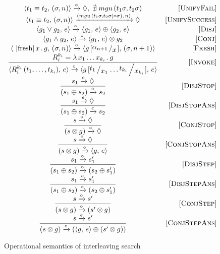 \begin{figure*}[h]
  \renewcommand{\arraystretch}{1.6}
  \[
  \begin{array}{cr}
    \taskst{t_1 \equiv t_2}{(\sigma, n)} \xrightarrow{\circ} \Diamond , \, \, \nexists\; mgu\,(t_1 \sigma, t_2 \sigma) &\ruleno{UnifyFail} \\
    \taskst{t_1 \equiv t_2}{(\sigma, n)} \xrightarrow{(mgu\,(t_1 \sigma, t_2 \sigma) \circ \sigma),\, n)} \Diamond & \ruleno{UnifySuccess} \\
    \taskst{g_1 \lor g_2}{e} \xrightarrow{\circ} \taskst{g_1}{e} \oplus \taskst{g_2}{e} & \ruleno{Disj} \\
    \taskst{g_1 \land g_2}{e} \xrightarrow{\circ} \taskst{g_1}{e} \otimes g_2 & \ruleno{Conj} \\
    \taskst{\mbox{\lstinline|fresh|}\, x\, .\, g}{(\sigma, n)} \xrightarrow{\circ} \taskst{g\,[\bigslant{\alpha_{n + 1}}{x}]}{( \sigma, n + 1)} & \ruleno{Fresh} \\
    \dfrac{R_i^{k_i}=\lambda\,x_1\dots x_{k_i}\,.\,g}{\taskst{R_i^{k_i}\,(t_1,\dots,t_{k_i})}{e} \xrightarrow{\circ} \taskst{g\,[\bigslant{t_1}{x_1}\dots\bigslant{t_{k_i}}{x_{k_i}}]}{e}} & \ruleno{Invoke}\\
    \dfrac{s_1 \xrightarrow{\circ} \Diamond}{(s_1 \oplus s_2) \xrightarrow{\circ} s_2} & \ruleno{DisjStop}\\
    \dfrac{s_1 \xrightarrow{e} \Diamond}{(s_1 \oplus s_2) \xrightarrow{e} s_2} & \ruleno{DisjStopAns}\\
    \dfrac{s \xrightarrow{\circ} \Diamond}{(s \otimes g) \xrightarrow{\circ} \Diamond} &\ruleno{ConjStop}\\
    \dfrac{s \xrightarrow{e} \Diamond}{(s \otimes g) \xrightarrow{\circ} \taskst{g}{e}}  & \ruleno{ConjStopAns}\\
    \dfrac{s_1 \xrightarrow{\circ} s'_1}{(s_1 \oplus s_2) \xrightarrow{\circ} (s_2 \oplus s'_1)} &\ruleno{DisjStep}\\
    \dfrac{s_1 \xrightarrow{e} s'_1}{(s_1 \oplus s_2) \xrightarrow{e} (s_2 \oplus s'_1)} &\ruleno{DisjStepAns}\\
    \dfrac{s \xrightarrow{\circ} s'}{(s \otimes g) \xrightarrow{\circ} (s' \otimes g)} &\ruleno{ConjStep}\\
    \dfrac{s \xrightarrow{e} s'}{(s \otimes g) \xrightarrow{\circ} (\taskst{g}{e} \oplus (s' \otimes g))} & \ruleno{ConjStepAns} 
  \end{array}
  \]
  \caption{Operational semantics of interleaving search}
  \label{fig:operanional_semantics_rules}
\end{figure*}

